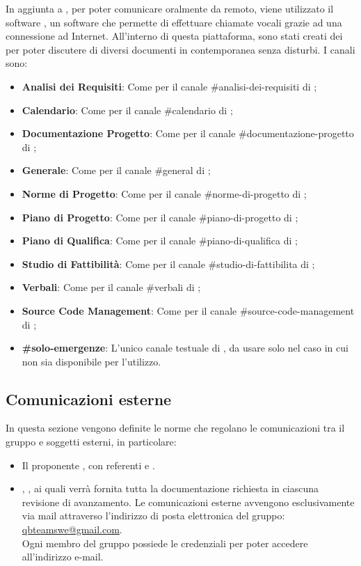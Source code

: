 In aggiunta a , per poter comunicare oralmente da remoto, viene utilizzato il software , un software che permette di effettuare chiamate vocali grazie ad una connessione ad Internet.
All'interno di questa piattaforma, sono stati creati dei  per poter discutere di diversi documenti in contemporanea senza disturbi.
I canali sono:
\begin{itemize}
	\item \textbf{Analisi dei Requisiti}: Come per il canale \#analisi-dei-requisiti di ;
	\item \textbf{Calendario}: Come per il canale \#calendario di ;
	\item \textbf{Documentazione Progetto}: Come per il canale \#documentazione-progetto di ;
	\item \textbf{Generale}: Come per il canale \#general di ;
	\item \textbf{Norme di Progetto}: Come per il canale \#norme-di-progetto di ;
    \item \textbf{Piano di Progetto}: Come per il canale \#piano-di-progetto di ;
	\item \textbf{Piano di Qualifica}: Come per il canale \#piano-di-qualifica di ;
	\item \textbf{Studio di Fattibilità}: Come per il canale \#studio-di-fattibilita di ;
	\item \textbf{Verbali}: Come per il canale \#verbali di ;
	\item \textbf{Source Code Management}: Come per il canale \#source-code-management di ;
	\item \textbf{\#solo-emergenze}: L'unico canale testuale di , da usare solo nel caso in cui  non sia disponibile per l'utilizzo.
\end{itemize}

\subsection{Comunicazioni esterne}
In questa sezione vengono definite le norme che regolano le comunicazioni tra il gruppo e soggetti esterni, in particolare:
\begin{itemize}
	\item Il proponente \Proponente{}, con referenti \ZD{} e \CT{}.
	\item \VT{}, \CR{}, ai quali verrà fornita tutta la documentazione richiesta in ciascuna revisione di avanzamento.
	Le comunicazioni esterne avvengono esclusivamente via mail attraverso l’indirizzo di posta elettronica del gruppo:
	\url{qbteamswe@gmail.com}. \\
	Ogni membro del gruppo possiede le credenziali per poter accedere all’indirizzo e-mail.
\end{itemize}
	
